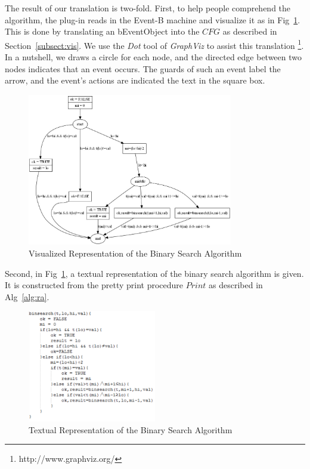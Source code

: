 \documentclass{easychair}
\begin{document}
The result of our translation is two-fold. First, to help people comprehend the algorithm, the plug-in reads in the Event-B machine and visualize it as in Fig~\ref{fig:pix}. This is done by translating an bEventObject into the $CFG$ as described in Section~\ref{subsect:vis}. We use the \textit{Dot} tool of \textit{GraphViz} to assist this translation \footnote{http://www.graphviz.org/}. In a nutshell, we draws a circle for each node, and the directed edge between two nodes indicates that an event occurs. The guards of such an event label the arrow, and the event's actions are indicated the text in the square box. 

\begin{figure}[!h]
  \centering
    \includegraphics[width=0.8\textwidth]{img/pix.jpg}
  \caption{Visualized Representation of the Binary Search Algorithm}
  \label{fig:pix}
\end{figure}

Second, in Fig~\ref{fig:pix}, a textual representation of the binary search algorithm is given. It is constructed from the pretty print procedure $Print$ as described in Alg~\ref{alg:ra}.
\begin{figure}[!h]
  \centering
    \includegraphics[width=0.5\textwidth]{img/alg.jpg}
  \caption{Textual Representation of the Binary Search Algorithm}
  \label{fig:alg}
\end{figure}
\end{document}
